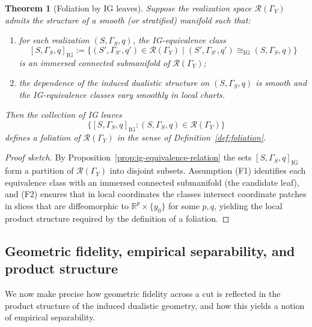 \documentclass[11pt]{article}
\newtheorem{theorem}{Theorem}
\begin{document}
\begin{theorem}[Foliation by IG leaves]
\label{thm:ig-foliation}
Suppose the realization space $\mathcal{R}(\Gamma_Y)$ admits the
structure of a smooth (or stratified) manifold such that:
\begin{enumerate}[label=(F\arabic*),leftmargin=1.8em]
  \item for each realization $(S,\Gamma_S,q)$, the IG-equivalence class
  \[
    [S,\Gamma_S,q]_{\mathrm{IG}}
    :=
    \bigl\{
      (S',\Gamma_{S'},q')\in\mathcal{R}(\Gamma_Y)
      \;\big|\;
      (S',\Gamma_{S'},q')\cong_{\mathrm{IG}}(S,\Gamma_S,q)
    \bigr\}
  \]
  is an immersed connected submanifold of $\mathcal{R}(\Gamma_Y)$;
  \item the dependence of the induced dualistic structure on
  $(S,\Gamma_S,q)$ is smooth and the IG-equivalence classes vary
  smoothly in local charts.
\end{enumerate}
Then the collection of IG leaves
\[
  \bigl\{[S,\Gamma_S,q]_{\mathrm{IG}}
  : (S,\Gamma_S,q)\in\mathcal{R}(\Gamma_Y)\bigr\}
\]
defines a foliation of $\mathcal{R}(\Gamma_Y)$ in the sense of
Definition~\ref{def:foliation}.
\end{theorem}

\begin{proof}[Proof sketch]
By Proposition~\ref{prop:ig-equivalence-relation} the sets
$[S,\Gamma_S,q]_{\mathrm{IG}}$ form a partition of
$\mathcal{R}(\Gamma_Y)$ into disjoint subsets. Assumption (F1)
identifies each equivalence class with an immersed connected submanifold
(the candidate leaf), and (F2) ensures that in local
coordinates the classes intersect coordinate patches in slices that are
diffeomorphic to $\mathbb{R}^p\times\{y_0\}$ for some $p,q$, yielding
the local product structure required by the definition of a foliation.
\end{proof}

\subsection{Geometric fidelity, empirical separability, and product structure}
\label{subsec:geom-fidelity-emp-separability}

We now make precise how geometric fidelity across a cut is reflected in
the product structure of the induced dualistic geometry, and how this
yields a notion of empirical separability.
\end{document}

